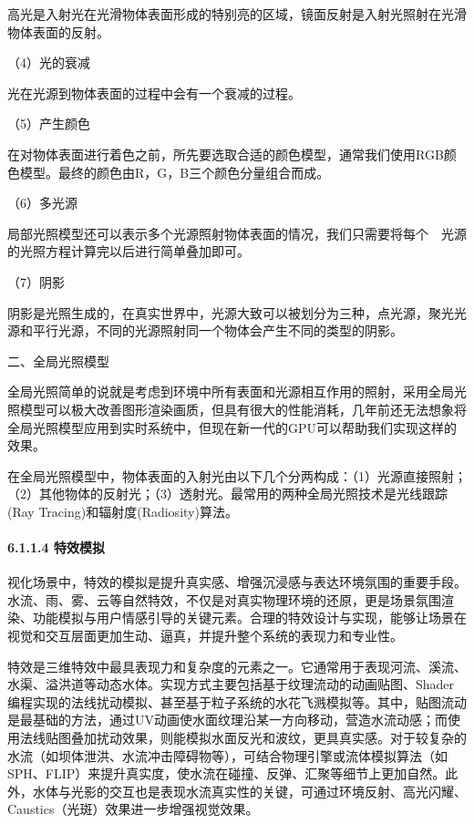 高光是入射光在光滑物体表面形成的特别亮的区域，镜面反射是入射光照射在光滑物体表面的反射。

（4）光的衰减

光在光源到物体表面的过程中会有一个衰减的过程。

（5）产生颜色

在对物体表面进行着色之前，所先要选取合适的颜色模型，通常我们使用RGB颜色模型。最终的颜色由R，G，B三个颜色分量组合而成。

（6）多光源

局部光照模型还可以表示多个光源照射物体表面的情况，我们只需要将每个　光源的光照方程计算完以后进行简单叠加即可。

（7）阴影

阴影是光照生成的，在真实世界中，光源大致可以被划分为三种，点光源，聚光光源和平行光源，不同的光源照射同一个物体会产生不同的类型的阴影。

二、全局光照模型

全局光照简单的说就是考虑到环境中所有表面和光源相互作用的照射，采用全局光照模型可以极大改善图形渲染画质，但具有很大的性能消耗，几年前还无法想象将全局光照模型应用到实时系统中，但现在新一代的GPU可以帮助我们实现这样的效果。

在全局光照模型中，物体表面的入射光由以下几个分两构成：（1）光源直接照射；（2）其他物体的反射光；（3）透射光。最常用的两种全局光照技术是光线跟踪(Ray Tracing)和辐射度(Radiosity)算法。

\hypertarget{ux7279ux6548ux6a21ux62df}{%
\paragraph{6.1.1.4 特效模拟}\label{ux7279ux6548ux6a21ux62df}}

视化场景中，特效的模拟是提升真实感、增强沉浸感与表达环境氛围的重要手段。水流、雨、雾、云等自然特效，不仅是对真实物理环境的还原，更是场景氛围渲染、功能模拟与用户情感引导的关键元素。合理的特效设计与实现，能够让场景在视觉和交互层面更加生动、逼真，并提升整个系统的表现力和专业性。

特效是三维特效中最具表现力和复杂度的元素之一。它通常用于表现河流、溪流、水渠、溢洪道等动态水体。实现方式主要包括基于纹理流动的动画贴图、Shader编程实现的法线扰动模拟、甚至基于粒子系统的水花飞溅模拟等。其中，贴图流动是最基础的方法，通过UV动画使水面纹理沿某一方向移动，营造水流动感；而使用法线贴图叠加扰动效果，则能模拟水面反光和波纹，更具真实感。对于较复杂的水流（如坝体泄洪、水流冲击障碍物等），可结合物理引擎或流体模拟算法（如SPH、FLIP）来提升真实度，使水流在碰撞、反弹、汇聚等细节上更加自然。此外，水体与光影的交互也是表现水流真实性的关键，可通过环境反射、高光闪耀、Caustics（光斑）效果进一步增强视觉效果。

